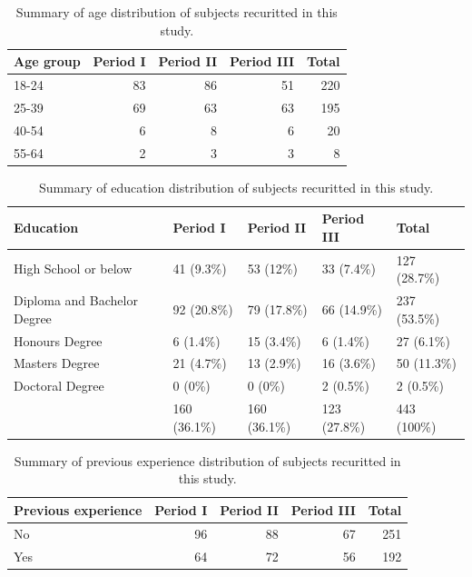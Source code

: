 \documentclass[]{interact}
\theoremstyle{plain}%
\theoremstyle{definition}
\theoremstyle{remark}
\begin{document}
\begin{table}

\caption{\label{tab:age-group}Summary of age distribution of subjects recuritted in this study.}
\centering
\begin{tabular}[t]{lrrrr}
\toprule
Age group & Period I & Period II & Period III & Total\\
\midrule
18-24 & 83 & 86 & 51 & 220\\
25-39 & 69 & 63 & 63 & 195\\
40-54 & 6 & 8 & 6 & 20\\
55-64 & 2 & 3 & 3 & 8\\
\bottomrule
\end{tabular}
\end{table}

\begin{table}

\caption{\label{tab:education}Summary of education distribution of subjects recuritted in this study.}
\centering
\begin{tabular}[t]{lllll}
\toprule
Education & Period I & Period II & Period III & Total\\
\midrule
High School or below & 41 (9.3\%) & 53 (12\%) & 33 (7.4\%) & 127 (28.7\%)\\
Diploma and Bachelor Degree & 92 (20.8\%) & 79 (17.8\%) & 66 (14.9\%) & 237 (53.5\%)\\
Honours Degree & 6 (1.4\%) & 15 (3.4\%) & 6 (1.4\%) & 27 (6.1\%)\\
Masters Degree & 21 (4.7\%) & 13 (2.9\%) & 16 (3.6\%) & 50 (11.3\%)\\
Doctoral Degree & 0 (0\%) & 0 (0\%) & 2 (0.5\%) & 2 (0.5\%)\\
\addlinespace
 & 160 (36.1\%) & 160 (36.1\%) & 123 (27.8\%) & 443 (100\%)\\
\bottomrule
\end{tabular}
\end{table}

\begin{table}

\caption{\label{tab:experience}Summary of previous experience distribution of subjects recuritted in this study.}
\centering
\begin{tabular}[t]{lrrrr}
\toprule
Previous experience & Period I & Period II & Period III & Total\\
\midrule
No & 96 & 88 & 67 & 251\\
Yes & 64 & 72 & 56 & 192\\
\bottomrule
\end{tabular}
\end{table}
\end{document}

